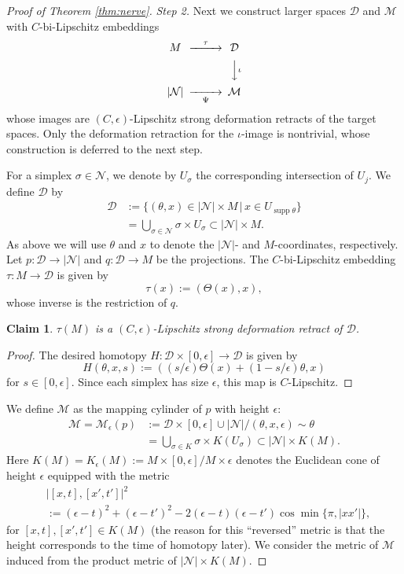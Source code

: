 \documentclass[a4paper,12pt]{amsart}
\theoremstyle{plain}
\newtheorem{clm}[thm]{Claim}
\theoremstyle{definition}
\numberwithin{thm}{section}
\numberwithin{equation}{section}
\DeclareMathOperator{\supp}{supp}
\newcommand{\step}[1]{\medskip\noindent\textit{#1.}}
\begin{document}
\begin{proof}[Proof of Theorem \ref{thm:nerve}]
\step{Step 2}
Next we construct larger spaces $\mathcal D$ and $\mathcal M$ with $C$-bi-Lipschitz embeddings
\[
\begin{CD}
M @>\tau >> \mathcal D\\
@.
@VV{\iota}V \\
|\mathcal N| @>>\Psi> \mathcal M
\end{CD}
\]
whose images are $(C,\epsilon)$-Lipschitz strong deformation retracts of the target spaces.
Only the deformation retraction for the $\iota$-image is nontrivial, whose construction is deferred to the next step.

For a simplex $\sigma\in\mathcal N$, we denote by $U_\sigma$ the corresponding intersection of $U_j$.
We define $\mathcal D$ by
\begin{align*}
\mathcal D&:=\{(\theta, x)\in |\mathcal N|\times M \,|\, x\in U_{\supp\theta}\} \\
 & =\bigcup_{\sigma\in\mathcal N} \sigma\times U_\sigma\subset |\mathcal N|\times M.
\end{align*}
As above we will use $\theta$ and $x$ to denote the $|\mathcal N|$- and $M$-coordinates, respectively.
Let $p:\mathcal D\to|\mathcal N|$ and $q:\mathcal D\to M$ be the projections.
The $C$-bi-Lipschitz embedding $\tau:M\to\mathcal D$ is given by
\[\tau(x):=(\Theta(x),x),\]
whose inverse is the restriction of $q$.

\begin{clm}\label{clm:tau}
$\tau(M)$ is a $(C,\epsilon)$-Lipschitz strong deformation retract of $\mathcal D$.
\end{clm}

\begin{proof}
The desired homotopy $H:\mathcal D\times[0,\epsilon]\to\mathcal D$ is given by
\[H(\theta,x,s):=((s/\epsilon)\Theta(x)+(1-s/\epsilon)\theta,x)\]
for $s\in[0,\epsilon]$.
Since each simplex has size $\epsilon$, this map is $C$-Lipschitz.
\end{proof}

We define $\mathcal M$ as the mapping cylinder of $p$ with height $\epsilon$:
\begin{align*}
\mathcal M=\mathcal M_\epsilon(p)&:= \mathcal D\times [0,\epsilon]\cup |\mathcal N|/(\theta, x,\epsilon)\sim \theta\\
&=\bigcup_{\sigma\in K} \sigma\times K(U_{{\sigma}})\subset |\mathcal N|\times K(M).
\end{align*}
Here $K(M)=K_\epsilon(M):=M\times [0,\epsilon]/M\times \epsilon$ denotes the Euclidean cone of height $\epsilon$ equipped with the metric
\begin{align*}
&\left|[x,t],[x',t']\right|^2\\
&:=(\epsilon- t)^2+(\epsilon-t')^2-2(\epsilon-t)(\epsilon-t')\cos\min\{\pi,|xx'|\},
\end{align*}
for $[x,t],[x',t']\in K(M)$ (the reason for this ``reversed'' metric is that the height corresponds to the time of homotopy later).
We consider the metric of $\mathcal M$ induced from the product metric of $|\mathcal N|\times K(M)$.


\end{proof}
\end{document}
